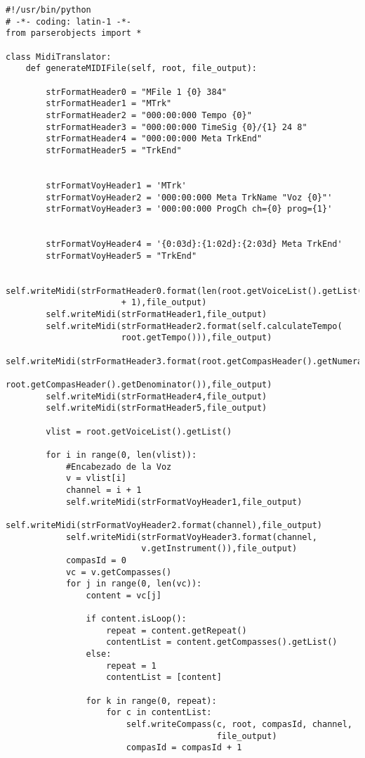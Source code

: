 \begin{verbatim}
#!/usr/bin/python
# -*- coding: latin-1 -*-
from parserobjects import *

class MidiTranslator:
    def generateMIDIFile(self, root, file_output):

        strFormatHeader0 = "MFile 1 {0} 384"
        strFormatHeader1 = "MTrk"
        strFormatHeader2 = "000:00:000 Tempo {0}"
        strFormatHeader3 = "000:00:000 TimeSig {0}/{1} 24 8"
        strFormatHeader4 = "000:00:000 Meta TrkEnd"
        strFormatHeader5 = "TrkEnd"


        strFormatVoyHeader1 = 'MTrk'
        strFormatVoyHeader2 = '000:00:000 Meta TrkName "Voz {0}"'
        strFormatVoyHeader3 = '000:00:000 ProgCh ch={0} prog={1}'


        strFormatVoyHeader4 = '{0:03d}:{1:02d}:{2:03d} Meta TrkEnd'
        strFormatVoyHeader5 = "TrkEnd"

        self.writeMidi(strFormatHeader0.format(len(root.getVoiceList().getList())
                       + 1),file_output)
        self.writeMidi(strFormatHeader1,file_output)
        self.writeMidi(strFormatHeader2.format(self.calculateTempo( 
                       root.getTempo())),file_output)
        self.writeMidi(strFormatHeader3.format(root.getCompasHeader().getNumerator(),
                       root.getCompasHeader().getDenominator()),file_output)
        self.writeMidi(strFormatHeader4,file_output)
        self.writeMidi(strFormatHeader5,file_output)

        vlist = root.getVoiceList().getList()

        for i in range(0, len(vlist)):
            #Encabezado de la Voz
            v = vlist[i]
            channel = i + 1
            self.writeMidi(strFormatVoyHeader1,file_output)
            self.writeMidi(strFormatVoyHeader2.format(channel),file_output)
            self.writeMidi(strFormatVoyHeader3.format(channel,
                           v.getInstrument()),file_output)
            compasId = 0
            vc = v.getCompasses()
            for j in range(0, len(vc)):
                content = vc[j]

                if content.isLoop():
                    repeat = content.getRepeat()
                    contentList = content.getCompasses().getList()
                else:
                    repeat = 1
                    contentList = [content]

                for k in range(0, repeat):
                    for c in contentList:
                        self.writeCompass(c, root, compasId, channel,
                                          file_output)
                        compasId = compasId + 1


\end{verbatim}
